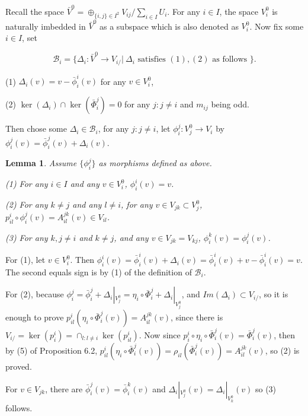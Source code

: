 \def\CTEXPreproc{Created by ctex v0.2.12, don't edit!}\documentclass[11pt]{article}
\newtheorem{lem}{Lemma}[section]
\begin{document}
  Recall the space $\bar{V}^0 =  \oplus _{ \{i,j\} \in I^2   } V_{ij} / \sum_{i\in I} U_i $. For any $i\in I$, the space $V^0 _i$ is naturally imbedded in $\bar{V}^0$ as a subspace which is also denoted as $V^0 _i$.  Now fix some $i\in I$, set

  \[ \mathscr{B}_i = \{ \Delta_i : \bar{V}^0 \rightarrow V_{i/} |\  \Delta_{i} \text{ satisfies }  (1),(2) \text{ as  follows }   \}. \]

   \noindent(1) $\Delta_i (v)= v-\bar{\phi}^{ i} _i (v)  $ for any $v\in V^0 _i$,

   \noindent (2) $\ker(\Delta_i )\cap \ker ( \bar{\Phi}^j _i  )=0 $ for any $j: j\neq i$ and  $m_{ij}$ being odd.

   Then chose some $\Delta_i \in \mathscr{B}_i $,  for any $ j:j\neq i $, let $\phi ^j _i : V^0 _j \rightarrow V_i$ by $ \phi ^j _i (v)= \bar{\phi}^j _i (v) + \Delta_i (v) $.

  \begin{lem} Assume $\{ \phi^j _i \} $ as morphisms defined as above.

  \noindent(1) For any $i\in I$ and any $v\in V^0 _i  $, $ \phi^i _i (v) =v $.

   \noindent(2) For any $k\neq j$ and any $l\neq i$, for any $v\in V_{jk}\subset V^0 _j$,  $p^i _{il} \circ \phi^j _i (v) =  A^{jk}_{il}(v) \in V_{il}$.

   \noindent(3) For any $k, j\neq i$ and $k\neq j$, and any $v\in V_{jk}=V_{kj}$, $ \phi^k _i (v)= \phi^j _i (v) $.


  \end{lem}

  \begin{pf}
  For (1), let $v\in V^0 _i$. Then $\phi^i _i (v) = \bar{\phi}^i _i (v) + \Delta_i (v) =  \bar{\phi}^i _i (v) + v-  \bar{\phi}^i _i (v)=v.  $ The second equals sign is by (1) of the definition of $\mathscr{B}_i$.

  For (2),  because $\phi^j _i =  \bar{\phi}^j _i + \Delta_i |_{V^0 _j }=  \eta_i \circ \bar{\Phi}^j _i  + \Delta_i |_{V^0 _j } $, and $Im(\Delta_i) \subset V_{i/}$, so it is enough to prove
   $p^i _{il} ( \eta_i \circ \bar{\Phi}^j _i (v)  ) = A^{jk}_{il}(v) $, since there is
   $V_{i/}=\ker(p^i _i) =\cap_{l:l\neq i} \ker(p^i _{il} ) $. Now since
    $ p^i _i \circ \eta_i \circ \bar{\Phi}^j _i (v)= \bar{\Phi}^j _i (v) $, then by (5) of Proposition 6.2,
   $p^i _{il} (  \eta_i \circ \bar{\Phi}^j _i (v)  ) = \rho_{il}( \bar{\Phi}^j _i (v)  ) = A^{jk}_{il}(v)  $, so (2) is proved.

  For $v\in  V_{jk}$, there are $ \bar{\phi}^j _i (v)=\bar{\phi}^k _i (v)  $ and $\Delta_i |_{V^0 _j} (v) = \Delta_i |_{V^0 _k} (v)   $ so (3) follows. \\

  \end{pf}
\end{document}
